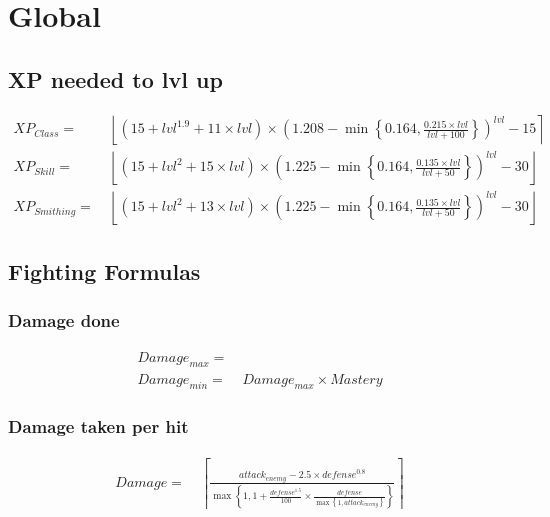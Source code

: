 \chapter{Global}
    \section{XP needed to lvl up}
        \begin{align*}
            XP_{Class} = &\ 
                \left\lfloor
                \left( 15+{lvl}^{1.9}+11 \times lvl \right)
                \times 
                \left( 1.208 - \min \left\{ 0.164,\frac{0.215\times {lvl}}{{lvl} + 100} \right\} \right)^{lvl}-15
                \right\rceil
            \\ 
            XP_{Skill} =  &\
                \left\lfloor
                \left( 15+{lvl}^{2}+15\times lvl \right)
                \times 
                \left( 1.225 - \min \left\{ 0.164,\frac{0.135\times {lvl}}{{lvl} + 50} \right\} \right)^{lvl}-30
                \right\rfloor
            \\ 
            XP_{Smithing} =  &\
                \left\lfloor
                \left( 15+{lvl}^{2}+13\times lvl \right)
                \times 
                \left( 1.225 - \min \left\{ 0.164,\frac{0.135\times {lvl}}{{lvl} + 50} \right\} \right)^{lvl}-30
                \right\rfloor
        \end{align*}

    \section{Fighting Formulas}
        \subsection{Damage done}
            \begin{align*}
                {Damage}_{max} =&\
                \\
                {Damage}_{min} =&\ {Damage}_{max} \times Mastery
            \end{align*}
        \subsection{Damage taken per hit}
            \begin{align*}
                Damage = &\
                    \left\lceil
                    \frac{ {attack}_{enemy} - 2.5 \times {defense}^{0.8} }
                        { \max \left\{1,1+ \frac{ {defense}^{1.5}}
                            {100} 
                        \times \frac{ {defense} }
                            { {\max \left\{1,{attack}_{enemy} \right\}} }\right\}
                        }
                    \right\rceil
            \end{align*}

